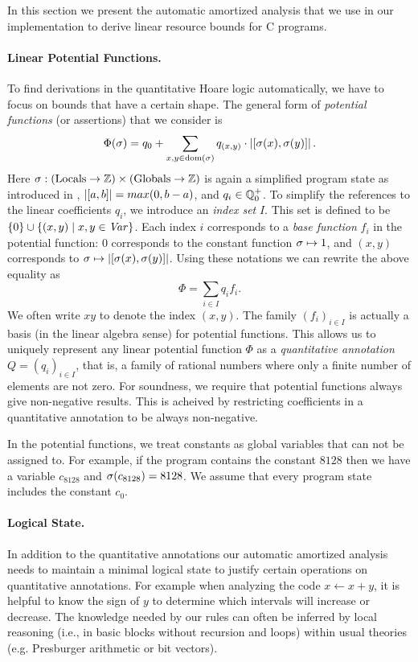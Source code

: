 \documentclass[nocopyrightspace,preprint]{sigplanconf}
\newcommand{\pref}[1]{\prettyref{#1}}
\begin{document}
In this section we present the automatic amortized analysis that we
use in our implementation to derive linear resource bounds for C
programs.

\paragraph{Linear Potential Functions.}

To find derivations in the quantitative Hoare logic automatically, we
have to focus on bounds that have a certain shape.  The general form
of \emph{potential functions} (or assertions) that we consider is
$$
  \Phi(\sigma) = q_0 + \sum_{x, y \in  \text{dom}(\sigma)}
    q_{(x, y)} \cdot |[\sigma(x),\sigma(y)]| \, .
$$
%
Here $\sigma : (\text{Locals} \to \mathbb{Z}) \times (\text{Globals} \to \mathbb{Z})$
is again a simplified program state as introduced in \pref{sec:sem},
$|[a,b]| = max(0,b-a)$, and $q_i \in \mathbb Q^+_0$.  To simplify the
references to the linear coefficients $q_i$, we introduce an \emph{index
  set} $I$.  This set is defined to be $\{0\} \cup \{(x, y) \mid x, y
\in \mathit{Var} \}$.  Each index $i$ corresponds to a \emph{base function}
$f_i$ in the potential function: $0$ corresponds to the constant
function $\sigma \mapsto 1$, and $(x,y)$ corresponds to $\sigma \mapsto
|[\sigma(x),\sigma(y)]|$.  Using these notations we can
rewrite the above equality as
$$
  \Phi = \sum_{i \in I} q_i f_i.
$$
We often write $xy$ to denote the index $(x,y)$.  The family
$(f_i)_{i\in I}$ is actually a basis (in the linear algebra sense) for
potential functions.  This allows us to uniquely represent any linear
potential function $\Phi$ as a \emph{quantitative annotation} $Q =
(q_i)_{i \in I}$, that is, a family of rational numbers where only a
finite number of elements are not zero.
%
For soundness, we require that potential functions always give
non-negative results.  This is acheived by restricting coefficients
in a quantitative annotation to be always non-negative.

In the potential functions, we treat constants as global variables
that can not be assigned to.  For example, if the program contains the
constant $8128$ then we have a variable $c_{8128}$ and
$\sigma(c_{8128}) = 8128$.  We assume that every program state
includes the constant $c_0$.

\paragraph{Logical State.}

In addition to the quantitative annotations our automatic amortized
analysis needs to maintain a minimal logical state to justify certain
operations on quantitative annotations.  For example when analyzing
the code $x \gets x + y$, it is helpful to know the sign of $y$ to
determine which intervals will increase or decrease.  The knowledge
needed by our rules can often be inferred by local reasoning (i.e., in
basic blocks without recursion and loops) within usual theories
(e.g. Presburger arithmetic or bit vectors).
\end{document}

